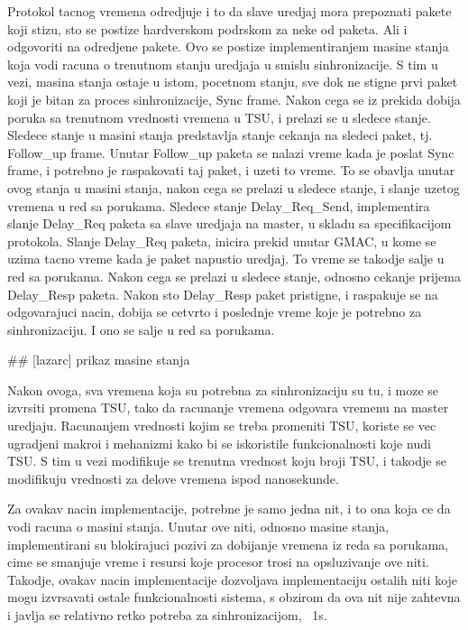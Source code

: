 \documentclass[a4paper,12pt, master]{etf}
\begin{document}
    Protokol tacnog vremena odredjuje i to da slave uredjaj mora prepoznati pakete koji stizu, sto se postize 
    hardverskom podrskom za neke od paketa. Ali i odgovoriti na odredjene pakete. Ovo se postize 
    implementiranjem masine stanja koja vodi racuna o trenutnom stanju uredjaja u smislu sinhronizacije. S 
    tim u vezi, masina stanja ostaje u istom, pocetnom stanju, sve dok ne stigne prvi paket koji je bitan za 
    proces sinhronizacije, Sync frame. Nakon cega se iz prekida dobija poruka sa trenutnom vrednosti vremena 
    u TSU, i prelazi se u sledece stanje. Sledece stanje u masini stanja predstavlja stanje cekanja na 
    sledeci paket, tj. Follow\_up frame. Unutar Follow\_up paketa se nalazi vreme kada je poslat Sync frame, 
    i potrebno je raspakovati taj paket, i uzeti to vreme. To se obavlja unutar ovog stanja u masini stanja, 
    nakon cega se prelazi u sledece stanje, i slanje uzetog vremena u red sa porukama. Sledece stanje 
    Delay\_Req\_Send, implementira slanje Delay\_Req paketa sa slave uredjaja na master, u skladu sa 
    specifikacijom protokola. Slanje Delay\_Req paketa, inicira prekid unutar GMAC, u kome se uzima tacno 
    vreme kada je paket napustio uredjaj. To vreme se takodje salje u red sa porukama. Nakon cega se prelazi 
    u sledece stanje, odnosno cekanje prijema Delay\_Resp paketa. Nakon sto Delay\_Resp paket pristigne, i 
    raspakuje se na odgovarajuci nacin, dobija se cetvrto i poslednje vreme koje je potrebno za 
    sinhronizaciju. I ono se salje u red sa porukama.

    \#\# [lazarc] prikaz masine stanja 
    
    Nakon ovoga, sva vremena koja su potrebna za sinhronizaciju su tu, i moze se izvrsiti promena TSU, tako 
    da racunanje vremena odgovara vremenu na master uredjaju. Racunanjem vrednosti kojim se treba promeniti 
    TSU, koriste se vec ugradjeni makroi i mehanizmi kako bi se iskoristile funkcionalnosti koje nudi TSU. S 
    tim u vezi modifikuje se trenutna vrednost koju broji TSU, i takodje se modifikuju vrednosti za delove 
    vremena ispod nanosekunde.

    Za ovakav nacin implementacije, potrebne je samo jedna nit, i to ona koja ce da vodi racuna o masini 
    stanja. Unutar ove niti, odnosno masine stanja, implementirani su blokirajuci pozivi za dobijanje vremena 
    iz reda sa porukama, cime se smanjuje vreme i resursi koje procesor trosi na opsluzivanje ove niti. 
    Takodje, ovakav nacin implementacije dozvoljava implementaciju ostalih niti koje mogu izvrsavati ostale 
    funkcionalnosti sistema, s obzirom da ova nit nije zahtevna i javlja se relativno retko potreba za 
    sinhronizacijom, ~1s.
\end{document}
